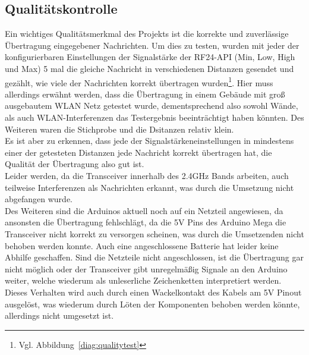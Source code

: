 \documentclass[a4paper, 11pt]{scrartcl}
\begin{document}
\subsection{Qualitätskontrolle}
Ein wichtiges Qualitätsmerkmal des Projekts ist die korrekte und zuverlässige Übertragung eingegebener Nachrichten. Um dies zu testen, wurden mit jeder der konfigurierbaren
Einstellungen der Signalstärke der RF24-API (Min, Low, High und Max) 5 mal die gleiche Nachricht in verschiedenen Distanzen gesendet und gezählt, wie viele der Nachrichten
korrekt übertragen wurden\footnote{Vgl. Abbildung~\ref{diag:qualitytest}}. Hier muss allerdings erwähnt werden, dass die Übertragung in einem Gebäude mit groß ausgebautem
WLAN Netz getestet wurde, dementsprechend also sowohl Wände, als auch WLAN-Interferenzen das Testergebnis beeinträchtigt haben könnten. Des Weiteren waren die Stichprobe und die Dsitanzen 
relativ klein.
\\
Es ist aber zu erkennen, dass jede der Signalstärkeneinstellungen in mindestens einer der getesteten Distanzen jede Nachricht korrekt übertragen hat, die Qualität der Übertragung
also gut ist.
\\
Leider werden, da die Transceiver innerhalb des 2.4GHz Bands arbeiten, auch teilweise Interferenzen als Nachrichten erkannt, was durch die Umsetzung nicht abgefangen wurde.
\\
Des Weiteren sind die Arduinos aktuell noch auf ein Netzteil angewiesen, da ansonsten die Übertragung fehlschlägt, da die 5V Pins des Arduino Mega die Transceiver
nicht korrekt zu versorgen scheinen, was durch die Umsetzenden nicht behoben werden konnte. Auch eine angeschlossene Batterie hat leider keine Abhilfe geschaffen.
Sind die Netzteile nicht angeschlossen, ist die Übertragung gar nicht möglich oder der Transceiver gibt unregelmäßig Signale an den Arduino weiter, welche wiederum als
unleserliche Zeichenketten interpretiert werden. Dieses
Verhalten wird auch durch einen Wackelkontakt des Kabels am 5V Pinout ausgelöst, was wiederum durch Löten der Komponenten behoben werden könnte, allerdings nicht umgesetzt ist.
\end{document}
